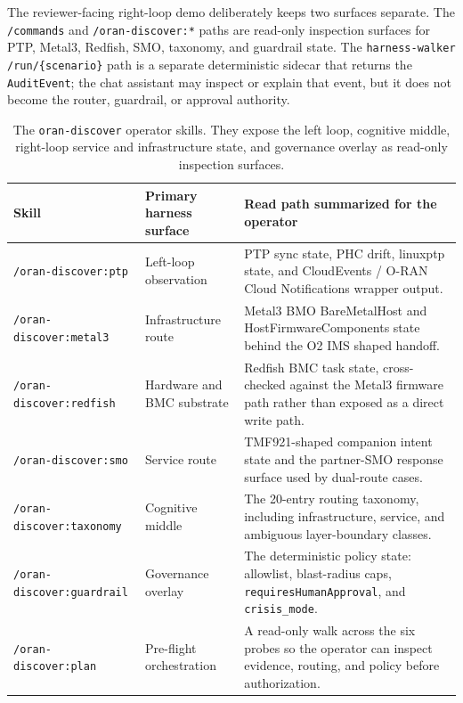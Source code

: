 \documentclass[twocolumn,10pt,a4paper]{article}
\begin{document}
The reviewer-facing right-loop demo deliberately keeps two surfaces separate. The \texttt{/commands} and \texttt{/oran-discover:*} paths are read-only inspection surfaces for PTP, Metal3, Redfish, SMO, taxonomy, and guardrail state. The \texttt{harness-walker} \texttt{/run/\{scenario\}} path is a separate deterministic sidecar that returns the \texttt{AuditEvent}; the chat assistant may inspect or explain that event, but it does not become the router, guardrail, or approval authority.

\begin{table}[t]
\centering
\scriptsize
\begin{tabularx}{\textwidth}{p{3.8cm}p{3.2cm}X}
\toprule
Skill & Primary harness surface & Read path summarized for the operator \\
\midrule
\texttt{/oran-discover:ptp} & Left-loop observation & PTP sync state, PHC drift, linuxptp state, and CloudEvents / O-RAN Cloud Notifications wrapper output. \\
\texttt{/oran-discover:metal3} & Infrastructure route & Metal3 BMO BareMetalHost and HostFirmwareComponents state behind the O2 IMS shaped handoff. \\
\texttt{/oran-discover:redfish} & Hardware and BMC substrate & Redfish BMC task state, cross-checked against the Metal3 firmware path rather than exposed as a direct write path. \\
\texttt{/oran-discover:smo} & Service route & TMF921-shaped companion intent state and the partner-SMO response surface used by dual-route cases. \\
\texttt{/oran-discover:taxonomy} & Cognitive middle & The 20-entry routing taxonomy, including infrastructure, service, and ambiguous layer-boundary classes. \\
\texttt{/oran-discover:guardrail} & Governance overlay & The deterministic policy state: allowlist, blast-radius caps, \texttt{requiresHumanApproval}, and \texttt{crisis\_mode}. \\
\texttt{/oran-discover:plan} & Pre-flight orchestration & A read-only walk across the six probes so the operator can inspect evidence, routing, and policy before authorization. \\
\bottomrule
\end{tabularx}
\caption{The \texttt{oran-discover} operator skills. They expose the left loop, cognitive middle, right-loop service and infrastructure state, and governance overlay as read-only inspection surfaces.}
\label{tab:discover-skills}
\end{table}
\end{document}
